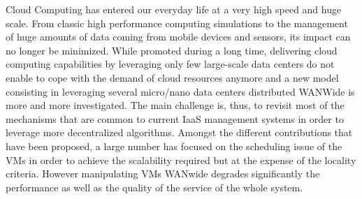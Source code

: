 
Cloud Computing has entered our everyday life at a very high speed and huge
scale. From classic high performance computing simulations to the management of
huge amounts of data coming from mobile devices and sensors, its impact can no
longer be minimized.
While promoted during a long time, delivering cloud computing capabilities by
leveraging only few large-scale data centers do not enable to cope with the
demand of cloud resources anymore and a new model consisting in leveraging
several micro/nano data centers distributed WANWide is more and more
investigated.
The main challenge is, thus, to revisit most of the mechanisms that are common
to current IaaS management systems in order to leverage more decentralized
algorithms. Amongst the different contributions that have been proposed, a large number has focused on the scheduling issue of the VMs 
in order to achieve the scalability required but at the expense of the locality criteria. 
However manipulating VMs WANwide degrades significantly the performance as well as the quality of the service of the whole system. 

% 


